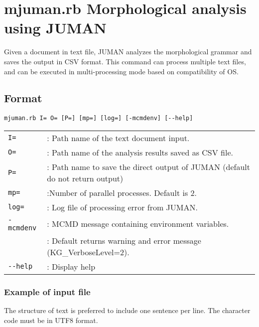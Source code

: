 



\section{mjuman.rb Morphological analysis using JUMAN \label{sect:mjuman}}

Given a document in text file, JUMAN analyzes the morphological grammar and saves the output in CSV format. 
This command can process multiple text files, and can be executed in  multi-processing mode  based on compatibility of OS. 


\subsection{Format}
\begin{verbatim}
mjuman.rb I= O= [P=] [mp=] [log=] [-mcmdenv] [--help]
\end{verbatim}

\begin{table}[htbp]
{\small
\begin{tabular}{ll}
\verb|I=|       & : Path name of the text document input.  \\
\verb|O=|       & : Path name of the analysis results saved as CSV file.  \\
\verb|P=|       & : Path name to save the direct output of JUMAN (default do not return output) \\
\verb|mp=|      & :Number of parallel processes.  Default is 2.  \\
\verb|log=|     & : Log file of processing error from JUMAN.  \\
\verb|-mcmdenv| & : MCMD message containing environment variables.  \\
                & : Default returns warning and error message  (KG\_VerboseLevel=2). \\
\verb|--help|   & : Display help \\
\end{tabular} 
}
\end{table} 

\subsubsection*{Example of input file}

The structure of text is preferred to include one sentence per line. 
The character code must be in UTF8 format. 

